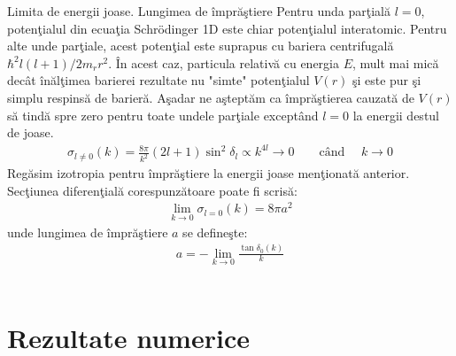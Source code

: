 \begin{frame}[allowframebreaks]{Limita de energii joase. Lungimea de \^{i}mpr\u{a}\c{s}tiere}
Pentru unda par\c{t}ial\u{a} $l=0$, poten\c{t}ialul din ecua\c{t}ia Schr\"{o}dinger 1D este chiar poten\c{t}ialul interatomic. Pentru alte unde par\c{t}iale, acest poten\c{t}ial este suprapus cu bariera centrifugal\u{a} $\hbar^2l(l+1)/2m_rr^2$. \^{I}n acest caz, particula relativ\u{a} cu energia $E$, mult mai mic\u{a} dec\^{a}t \^{i}n\u{a}l\c{t}imea barierei rezultate nu "simte" poten\c{t}ialul $V(r)$ \c{s}i este pur \c{s}i simplu respins\u{a} de barier\u{a}. A\c{s}adar ne a\c{s}tept\u{a}m ca \^{i}mpr\u{a}\c{s}tierea cauzat\u{a} de $V(r)$ s\u{a} tind\u{a} spre zero pentru toate undele par\c{t}iale except\^{a}nd $l=0$ la energii destul de joase.\\
\begin{align}
\sigma_{l\neq0}(k)=\frac{8\pi}{k^2}(2l+1)\sin^2\delta_l \propto k^{4l} \to 0 \qquad \text{c\^{a}nd }\quad k\to 0
\end{align}
Reg\u{a}sim izotropia pentru \^{i}mpr\u{a}\c{s}tiere la energii joase men\c{t}ionat\u{a} anterior. Sec\c{t}iunea diferen\c{t}ial\u{a} corespunz\u{a}toare poate fi scris\u{a}:
\begin{align}
\lim_{k\to 0}\sigma_{l=0}(k)=8\pi a^2
\end{align}
unde lungimea de \^{i}mpr\u{a}\c{s}tiere $a$ se define\c{s}te:
\begin{align}
a=-\lim_{k\to 0}\frac{\tan\delta_0(k)}{k}
\end{align}\\
\end{frame} 

\section{Rezultate numerice}


